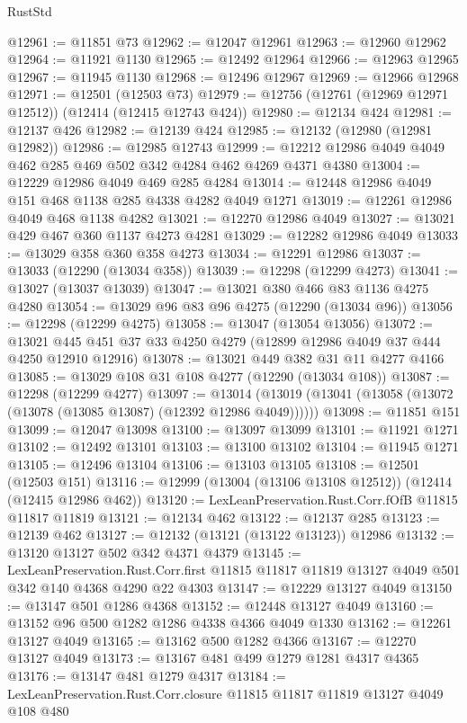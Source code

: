 \begin{lexlean}{RustStd}
\begin{coremodule}
{\begin{coremodule}
{{{{{{{{{{{{{{{{{{{{{{{{{{{{{{{{{{{{{{{{{{{{{{{{{{@12961 := @11851 @73
@12962 := @12047 @12961
@12963 := @12960 @12962
@12964 := @11921 @1130
@12965 := @12492 @12964
@12966 := @12963 @12965
@12967 := @11945 @1130
@12968 := @12496 @12967
@12969 := @12966 @12968
@12971 := @12501 (@12503 @73)
@12979 := @12756 (@12761 (@12969 @12971 @12512)) (@12414 (@12415 @12743 @424))
@12980 := @12134 @424
@12981 := @12137 @426
@12982 := @12139 @424
@12985 := @12132 (@12980 (@12981 @12982))
@12986 := @12985 @12743
@12999 := @12212 @12986 @4049 @4049 @462 @285 @469 @502 @342 @4284 @462 @4269 @4371 @4380
@13004 := @12229 @12986 @4049 @469 @285 @4284
@13014 := @12448 @12986 @4049 @151 @468 @1138 @285 @4338 @4282 @4049 @1271
@13019 := @12261 @12986 @4049 @468 @1138 @4282
@13021 := @12270 @12986 @4049
@13027 := @13021 @429 @467 @360 @1137 @4273 @4281
@13029 := @12282 @12986 @4049
@13033 := @13029 @358 @360 @358 @4273
@13034 := @12291 @12986
@13037 := @13033 (@12290 (@13034 @358))
@13039 := @12298 (@12299 @4273)
@13041 := @13027 (@13037 @13039)
@13047 := @13021 @380 @466 @83 @1136 @4275 @4280
@13054 := @13029 @96 @83 @96 @4275 (@12290 (@13034 @96))
@13056 := @12298 (@12299 @4275)
@13058 := @13047 (@13054 @13056)
@13072 := @13021 @445 @451 @37 @33 @4250 @4279 (@12899 @12986 @4049 @37 @444 @4250 @12910 @12916)
@13078 := @13021 @449 @382 @31 @11 @4277 @4166
@13085 := @13029 @108 @31 @108 @4277 (@12290 (@13034 @108))
@13087 := @12298 (@12299 @4277)
@13097 := @13014 (@13019 (@13041 (@13058 (@13072 (@13078 (@13085 @13087) (@12392 @12986 @4049))))))
@13098 := @11851 @151
@13099 := @12047 @13098
@13100 := @13097 @13099
@13101 := @11921 @1271
@13102 := @12492 @13101
@13103 := @13100 @13102
@13104 := @11945 @1271
@13105 := @12496 @13104
@13106 := @13103 @13105
@13108 := @12501 (@12503 @151)
@13116 := @12999 (@13004 (@13106 @13108 @12512)) (@12414 (@12415 @12986 @462))
@13120 := LexLeanPreservation.Rust.Corr.fOfB @11815 @11817 @11819
@13121 := @12134 @462
@13122 := @12137 @285
@13123 := @12139 @462
@13127 := @12132 (@13121 (@13122 @13123)) @12986
@13132 := @13120 @13127 @502 @342 @4371 @4379
@13145 := LexLeanPreservation.Rust.Corr.first
    @11815
    @11817
    @11819
    @13127
    @4049
    @501
    @342
    @140
    @4368
    @4290
    @22
    @4303
@13147 := @12229 @13127 @4049
@13150 := @13147 @501 @1286 @4368
@13152 := @12448 @13127 @4049
@13160 := @13152 @96 @500 @1282 @1286 @4338 @4366 @4049 @1330
@13162 := @12261 @13127 @4049
@13165 := @13162 @500 @1282 @4366
@13167 := @12270 @13127 @4049
@13173 := @13167 @481 @499 @1279 @1281 @4317 @4365
@13176 := @13147 @481 @1279 @4317
@13184 := LexLeanPreservation.Rust.Corr.closure @11815 @11817 @11819 @13127 @4049 @108 @480
}}}}}}}}}}}}}}}}}}}}}}}}}}}}}}}}}}}}}}}}}}}}}}}}}}
\end{coremodule}}
\end{coremodule}
\end{lexlean}
